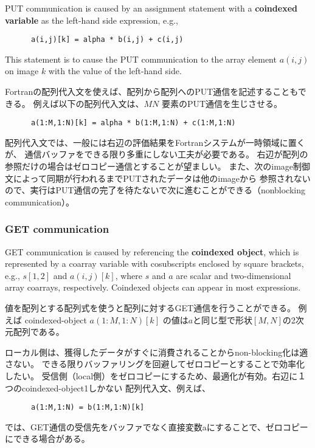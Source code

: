 PUT communication is caused by an assignment statement with a {\bf coindexed variable} 
as the left-hand side expression, e.g.,
\begin{verbatim}
      a(i,j)[k] = alpha * b(i,j) + c(i,j)
\end{verbatim}
This statement is to cause the PUT communication to the array element $a(i,j)$ on image $k$
with the value of the left-hand side.

Fortranの配列代入文を使えば、配列から配列へのPUT通信を記述することもできる。
例えば以下の配列代入文は、$M N$ 要素のPUT通信を生じさせる。
\begin{verbatim}
      a(1:M,1:N)[k] = alpha * b(1:M,1:N) + c(1:M,1:N)
\end{verbatim}

\requirement
配列代入文では、一般には右辺の評価結果をFortranシステムが一時領域に置くが、
通信バッファをできる限り多重にしない工夫が必要である。
右辺が配列の参照だけの場合はゼロコピー通信とすることが望ましい。
また、次のimage制御文によって同期が行われるまでPUTされたデータは他のimageから
参照されないので、実行はPUT通信の完了を待たないで次に進むことができる（nonblocking communication）。


\subsubsection{GET communication}\label{sec:GET}

GET communication is caused by referencing the {\bf coindexed object}, 
which is represented by a coarray variable with cosubscripts enclosed by square brackets, 
e.g., $s[1,2]$ and $a(i,j)[k]$, where $s$ and $a$ are scalar and two-dimensional array coarrays,
respectively.
Coindexed objects can appear in most expressions.

値を配列とする配列式を使うと配列に対するGET通信を行うことができる。
例えば coindexed-object $a(1:M,1:N)[k]$ の値は$a$と同じ型で形状$[M, N]$の2次元配列である。


\requirement
ローカル側は、獲得したデータがすぐに消費されることからnon-blocking化は適さない。
できる限りバッファリングを回避してゼロコピーとすることで効率化したい。
受信側（local側）をゼロコピーにするため、最適化が有効。右辺に１つのcoindexed-object1しかない
配列代入文、例えば、
\begin{verbatim}
      a(1:M,1:N) = b(1:M,1:N)[k]
\end{verbatim}
では、GET通信の受信先をバッファでなく直接変数aにすることで、ゼロコピーにできる場合がある。


